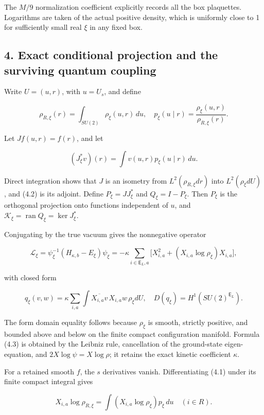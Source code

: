 The \(M/9\) normalization coefficient explicitly records all the box
plaquettes. Logarithms are taken of the actual positive density, which
is uniformly close to 1 for sufficiently small real \(\xi\) in any fixed
box.

\subsection{4. Exact conditional projection and the surviving quantum
coupling}\label{bulk-exact-conditional-projection-and-the-surviving-quantum-coupling}

Write \(U=(u,r)\), with \(u=U_s\), and define

\[
\rho_{R,\xi}(r)=\int_{SU(2)}\rho_\xi(u,r)\,du,
\quad p_\xi(u\mid r)=\frac{\rho_\xi(u,r)}{\rho_{R,\xi}(r)}.
\tag{4.1}
\]

Let \(Jf(u,r)=f(r)\), and let

\[
(J_\xi^*v)(r)=\int v(u,r)p_\xi(u\mid r)\,du.
\tag{4.2}
\]

Direct integration shows that \(J\) is an isometry from
\(L^2(\rho_{R,\xi}dr)\) into \(L^2(\rho_\xi dU)\), and (4.2) is its
adjoint. Define \(P_\xi=JJ_\xi^*\) and \(Q_\xi=I-P_\xi\). Then \(P_\xi\)
is the orthogonal projection onto functions independent of \(u\), and
\(\mathcal K_\xi=\operatorname{ran}Q_\xi=\ker J_\xi^*\).

Conjugating by the true vacuum gives the nonnegative operator

\[
\mathscr L_\xi=\psi_\xi^{-1}(H_{\kappa,b}-E_\xi)\psi_\xi
=-\kappa\sum_{i\in\mathsf E_L,a}
 \big[X_{i,a}^2+(X_{i,a}\log\rho_\xi)X_{i,a}\big],
\tag{4.3}
\]

with closed form

\[
q_\xi(v,w)=\kappa\sum_{i,a}\int
 \overline{X_{i,a}v}\,X_{i,a}w\,\rho_\xi dU,
\quad D(q_\xi)=H^1(SU(2)^{\mathsf E_L}).
\tag{4.4}
\]

The form domain equality follows because \(\rho_\xi\) is smooth,
strictly positive, and bounded above and below on the finite compact
configuration manifold. Formula (4.3) is obtained by the Leibniz rule,
cancellation of the ground-state eigen-equation, and
\(2X\log\psi=X\log\rho\); it retains the exact kinetic coefficient
\(\kappa\).

For a retained smooth \(f\), the \(s\) derivatives vanish.
Differentiating (4.1) under its finite compact integral gives

\[
X_{i,a}\log\rho_{R,\xi}
=\int (X_{i,a}\log\rho_\xi)p_\xi\,du
\quad(i\in R).
\]


